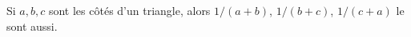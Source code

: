 Si $a, b, c$ sont les côtés d'un triangle, alors $1/(a + b)$, $1/(b + c)$, $1/(c + a)$ le sont aussi.
